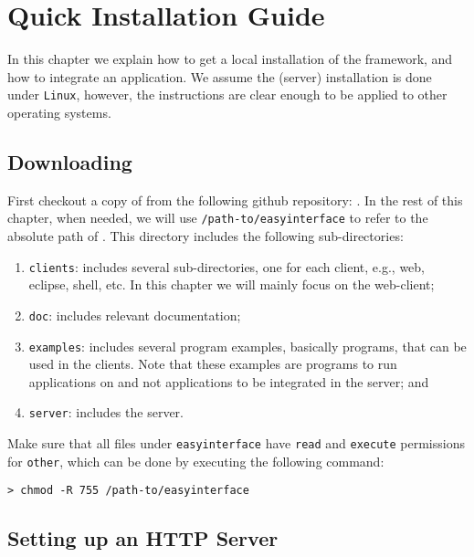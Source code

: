 {%
}

\chapter{Quick Installation Guide}

In this chapter we explain how to get a local installation of the \ei
framework, and how to integrate an application. We assume the (server)
installation is done under \texttt{Linux}, however, the instructions
are clear enough to be applied to other operating systems.

\section{Downloading \ei}

First checkout a copy of \ei from the following github repository:
\eigithub.
%
In the rest of this chapter, when needed, we will use
\texttt{/path-to/easyinterface} to refer to the absolute path of
\ei. This directory includes the following sub-directories:
%
\begin{enumerate} 
%
%
\item \texttt{clients}: includes several sub-directories, one for each
  client, e.g., web, eclipse, shell, etc. In this chapter we will
  mainly focus on the web-client;
%
\item \texttt{doc}: includes relevant documentation;
%
%
\item \texttt{examples}: includes several program examples, basically
  \abs programs, that can be used in the \ei clients. Note that these
  examples are programs to run applications on and not applications to
  be integrated in the server; and
%
\item \texttt{server}: includes the \ei server.
%
\end{enumerate}
%
Make sure that all files under \texttt{easyinterface} have
\texttt{read} and \texttt{execute} permissions for \texttt{other},
which can be done by executing the following command:

\medskip
\begin{lstlisting}[style=shell]
> chmod -R 755 /path-to/easyinterface
\end{lstlisting}

\section{Setting up an HTTP Server}

